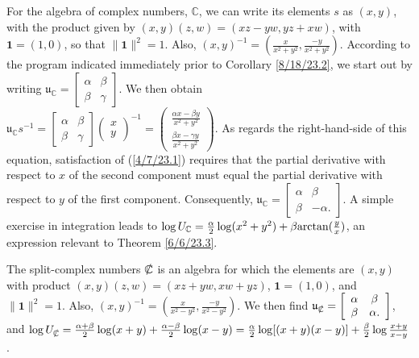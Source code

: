\documentclass{amsart}
\numberwithin{equation}{section}
\theoremstyle{definition}
\numberwithin{theorem}{section}
\begin{document}
For the algebra of complex numbers, $\mathbb{C}$, we can write its elements $s$ as $(x,y)$, with the product given by $(x,y)(z,w) = (xz-yw, yz+xw)$, with $\mathbf{1}=(1,0)$, so that $\|\mathbf{1}\|^2=1$.  Also, $(x,y)^{-1} = (\frac{x}{x^2+y^2},\frac{-y}{x^2+y^2})$.  According to the program indicated immediately prior to Corollary \ref{8/18/23.2}, we start out by writing  $\mathfrak{u}_\mathbb{C} = \left[\begin{array}{ccc}
 \alpha & \beta   \\ 
 \beta & \gamma    
\end{array}\right]$.  We then obtain  $\mathfrak{u}_\mathbb{C}s^{-1} = \left[\begin{array}{ccc}
 \alpha & \beta   \\ 
 \beta & \gamma    
\end{array}\right]\left(\begin{array}{ccc}
x   \\ 
y   
\end{array}\right)^{-1} = \left(\begin{array}{ccc}
\frac{\alpha x - \beta y}{x^2+y^2}  \\ 
\frac{\beta x - \gamma y}{x^2+y^2} 
\end{array}\right)$.  As regards the right-hand-side of this equation, satisfaction of (\ref{4/7/23.1}) requires that the partial derivative with respect to $x$ of the second component must equal the partial derivative with respect to $y$ of the first component.  Consequently, $\mathfrak{u}_{\mathbb{C}} = \left[\begin{array}{ccc}
 \alpha & \beta   \\ 
 \beta & -\alpha.    
\end{array}\right]$.  A simple exercise in integration leads to $\log  U_{\mathbb{C}} = \frac{\alpha}{2}\log(x^2+y^2) + \beta{\rm arctan}(\frac{y}{x})$, an expression relevant to Theorem \ref{6/6/23.3}.

The split-complex numbers $\slashed{\mathbb{C}}$ is an algebra for which the elements are  $(x,y)$ with product $(x,y)(z,w) = (xz+yw,xw+yz)$, $ \mathbf{1} = (1,0)$, and $\|\mathbf{1}\|^2 = 1$.  Also, $(x,y)^{-1} = (\frac{x}{x^2-y^2},\frac{-y}{x^2-y^2})$.  We then find $\mathfrak{u}_{\slashed{\mathbb{C}}} = \left[\begin{array}{ccc}
 \alpha & \beta   \\ 
 \beta & \alpha.    
\end{array}\right]$, and $\log  U_{\slashed{\mathbb{C}}} = \frac{\alpha+\beta}{2}\log(x+y) + \frac{\alpha-\beta}{2}\log(x-y) = \frac{\alpha}{2}\log[(x+
y)(x-y)] +  \frac{\beta}{2}\log \frac{x+y}{x-y}$.
\end{document}
